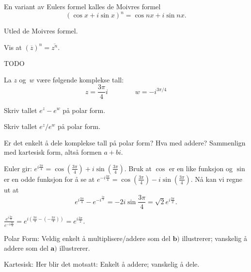 \begin{oppgave}
En variant av Eulers formel kalles de Moivres formel
\[
(\cos x + i\sin x)^n=\cos nx + i\sin nx.
\]
\begin{punkt}
Utled de Moivres formel.
\end{punkt}

\begin{punkt}
Vis at $(\overline z)^n=\overline{z^n}$.
\end{punkt}
\end{oppgave}


\begin{losning}
TODO
\end{losning}


\begin{oppgave}
La $z$ og~$w$ være følgende komplekse tall:
\[
z = \frac{3\pi}{4} i
\qquad\qquad
w = -i^{3\pi/4}
\]
\begin{punkt}
Skriv tallet $e^z - e^w$ på polar form.
\end{punkt}

\begin{punkt}
Skriv tallet $e^z/e^w$ på polar form.
\end{punkt}

\begin{punkt}
Er det enkelt å dele komplekse tall på polar form?
Hva med addere?
Sammenlign med kartesisk form, altså formen $a + bi$.
\end{punkt}

\end{oppgave}

\begin{losning}

\begin{punkt}
Euler gir: $e^{i\frac{3\pi}{4}}=\cos(\frac{3\pi}{4})+i\sin (\frac{3\pi}{4})$. Bruk at $\cos$ er en like funksjon og $\sin$ er en odde funksjon for å se at $e^{-i\frac{3\pi}{4}}=\cos(\frac{3\pi}{4})-i\sin (\frac{3\pi}{4})$. Nå kan vi regne ut at $$e^{i\frac{3\pi}{4}}-e^{-i^\frac{3 \pi}{4}}=-2i\sin \frac{3\pi}{4}=\sqrt{2}e^{i\frac{3\pi}{2}}.$$
\end{punkt}

\begin{punkt}
$\frac{e^{i\frac{3\pi}{4}}}{e^{-i\frac{3 \pi}{4}}}=e^{i(\frac{3\pi}{4}-(-\frac{3 \pi}{4}))}=e^{i\frac{3\pi}{2}}.$ 
\end{punkt}

\begin{punkt}
Polar Form: Veldig enkelt å multiplisere/addere som del $\textbf{b)}$ illustrerer; vanskelig å addere som del $\textbf{a)}$ illustrerer.

\noindent
Kartesisk: Her blir det motsatt: Enkelt å addere; vanskelig å dele.
\end{punkt}

\end{losning}



